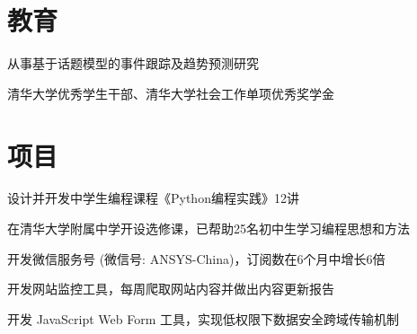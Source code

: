 \documentclass[a4paper]{rukh-cv-zh}
\begin{document}
\begin{minipage}[t]{0.74\textwidth} %


\section{教育}

\vspace{\topsep}
\begin{tightitemize}
\item 从事基于话题模型的事件跟踪及趋势预测研究
\end{tightitemize}

\sectionspace


\begin{tightitemize}
\item 清华大学优秀学生干部、清华大学社会工作单项优秀奖学金
\end{tightitemize}

\sectionspace


\section{项目}

\begin{tightitemize}
\item 设计并开发中学生编程课程《Python编程实践》12讲
\item 在清华大学附属中学开设选修课，已帮助25名初中生学习编程思想和方法
\end{tightitemize}

\sectionspace


\begin{tightitemize}
\item 开发微信服务号 (微信号: ANSYS-China)，订阅数在6个月中增长6倍
\item 开发网站监控工具，每周爬取网站内容并做出内容更新报告
\item 开发 JavaScript Web Form 工具，实现低权限下数据安全跨域传输机制
\end{tightitemize}


\end{minipage}
\end{document}
